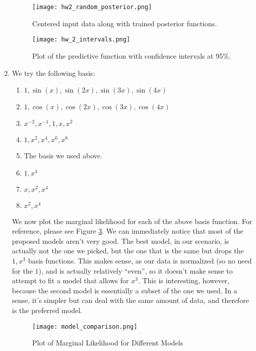 \documentclass[submit]{harvardml}
\begin{document}
\begin{enumerate}
\begin{figure}[!h]
\centering
\texttt{[image: hw2\_random\_posterior.png]}
\caption{Centered input data along with trained posterior functions.}
\label{fig:posterior}
\end{figure}

\begin{figure}[!h]
\centering
\texttt{[image: hw\_2\_intervals.png]}
\caption{Plot of the predictive function with confidence intervals at $95\%$.}
\label{fig:predictive}
\end{figure}

\item We try the following basis:
\begin{enumerate}
\item $1, \sin(x), \sin(2x), \sin(3x), \sin(4x)$
\item $1, \cos(x), \cos(2x),\cos(3x), \cos(4x)$
\item $x^{-2}, x^{-1}, 1, x, x^2$
\item $1, x^2, x^4, x^6, x^8$
\item The basis we used above.
\item $1, x^4$
\item $x, x^2, x^4$
\item $x^2, x^4$
\end{enumerate}
We now plot the marginal likelihood for each of the above basis function. For reference, please see Figure \ref{fig:bar_plot}. We can immediately notice that most of the proposed models aren't very good. The best model, in our scenario, is actually not the one we picked, but the one that is the same but drops the $1,x^3$ basis functions. This makes sense, as our data is normalized (so no need for the $1$), and is actually relatively ``even'', so it doesn't make sense to attempt to fit a model that allows for $x^3$. This is interesting, however, because the second model is essentially a subset of the one we used. In a sense, it's simpler but can deal with the same amount of data, and therefore is the preferred model.

\begin{figure}[!h]
\centering
\texttt{[image: model\_comparison.png]}
\caption{Plot of Marginal Likelihood for Different Models}
\label{fig:bar_plot}
\end{figure}
\end{enumerate}
\end{document}
